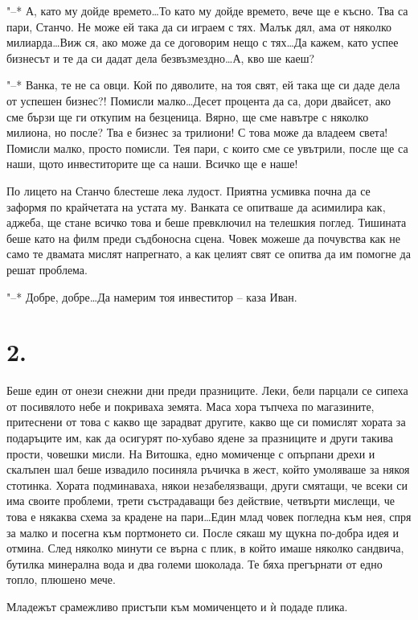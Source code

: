 \documentclass[ebook,openany,12pt]{memoir}
\begin{document}
"--* А, като му дойде времето\ldots То като му дойде времето, вече ще е късно. Тва са пари, Станчо. Не може ей така да си играем с тях. Малък дял, ама от няколко милиарда\ldots Виж ся, ако може да се договорим нещо с тях\ldots Да кажем, като успее бизнесът и те да си дадат дела безвъзмездно\ldots А, кво ше каеш?

"--* Ванка, те не са овци. Кой по дяволите, на тоя свят, ей така ще си даде дела от успешен бизнес?! Помисли малко\ldots Десет процента да са, дори двайсет, ако сме бързи ще ги откупим на безценица. Вярно, ще сме навътре с няколко милиона, но после? Тва е бизнес за трилиони! С това може да владеем света! Помисли малко, просто помисли. Тея пари, с които сме се увътрили, после ще са наши, щото инвеститорите ще са наши. Всичко ще е наше!

По лицето на Станчо блестеше лека лудост. Приятна усмивка почна да се заформя по крайчетата на устата му. Ванката се опитваше да асимилира как, аджеба, ще стане всичко това и беше превключил на телешкия поглед. Тишината беше като на филм преди съдбоносна сцена. Човек можеше да почувства как не само те двамата мислят напрегнато, а как целият свят се опитва да им помогне да решат проблема. 

"--* Добре, добре\ldots Да намерим тоя инвеститор – каза Иван.

\section*{2.}

Беше един от онези снежни дни преди празниците. Леки, бели парцали се сипеха от посивялото небе и покриваха земята. Маса хора тъпчеха по магазините, притеснени от това с какво ще зарадват другите, какво ще си помислят хората за подаръците им, как да осигурят по-хубаво ядене за празниците и други такива прости, човешки мисли. На Витошка, едно момиченце с опърпани дрехи и скалъпен шал беше извадило посиняла ръчичка в жест, който умоляваше за някоя стотинка. Хората подминаваха, някои незабелязващи, други смятащи, че всеки си има своите проблеми, трети състрадаващи без действие, четвърти мислещи, че това е някаква схема за крадене на пари\ldots Един млад човек погледна към нея, спря за малко и посегна към портмонето си. После сякаш му щукна по-добра идея и отмина. След няколко минути се върна с плик, в който имаше няколко сандвича, бутилка минерална вода и два големи шоколада. Те бяха прегърнати от едно топло, плюшено мече. 

Младежът срамежливо пристъпи към момиченцето и ѝ подаде плика. 
\end{document}
